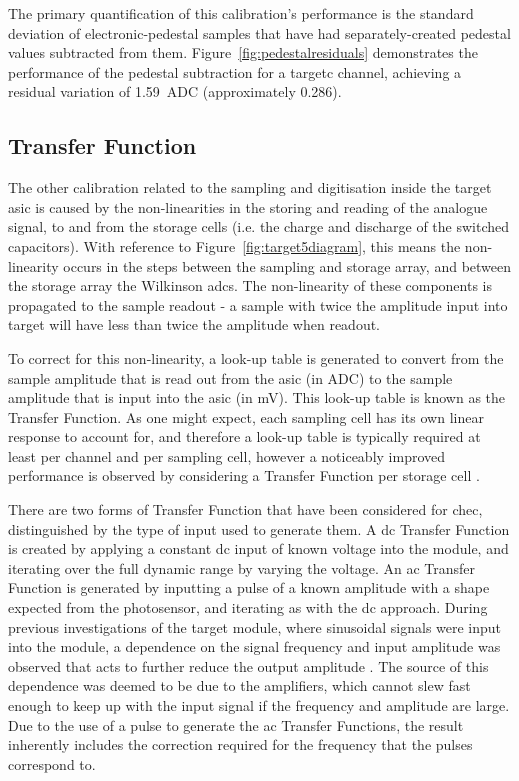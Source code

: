 The primary quantification of this calibration's performance is the standard deviation of electronic-pedestal samples that have had separately-created pedestal values subtracted from them. Figure~\ref{fig:pedestalresiduals} demonstrates the performance of the pedestal subtraction for a \gls{targetc} channel, achieving a residual variation of \SI{1.59}{ADC} (approximately \SI{0.286}{\pe}).

\subsection{Transfer Function}

The other calibration related to the sampling and digitisation inside the \gls{target} \gls{asic} is caused by the non-linearities in the storing and reading of the analogue signal, to and from the storage cells (i.e. the charge and discharge of the switched capacitors). With reference to Figure~\ref{fig:target5diagram}, this means the non-linearity occurs in the steps between the sampling and storage array, and between the storage array the Wilkinson \glspl{adc}. The non-linearity of these components is propagated to the sample readout - a sample with twice the amplitude input into \gls{target} will have less than twice the amplitude when readout.

To correct for this non-linearity, a look-up table is generated to convert from the sample amplitude that is read out from the \gls{asic} (in \si{ADC}) to the sample amplitude that is input into the \gls{asic} (in \si{mV}). This look-up table is known as the Transfer Function. As one might expect, each sampling cell has its own linear response to account for, and therefore a look-up table is typically required at least per channel and per sampling cell, however a noticeably improved performance is observed by considering a Transfer Function per storage cell .

There are two forms of Transfer Function that have been considered for \gls{chec}, distinguished by the type of input used to generate them. A \gls{dc} Transfer Function is created by applying a constant \gls{dc} input of known voltage into the module, and iterating over the full dynamic range by varying the voltage. An \gls{ac} Transfer Function is generated by inputting a pulse of a known amplitude with a shape expected from the photosensor, and iterating as with the \gls{dc} approach. During previous investigations of the \gls{target} module, where sinusoidal signals were input into the module, a dependence on the signal frequency and input amplitude was observed that acts to further reduce the output amplitude \cite{Bechtol2012,Albert2017}. The source of this dependence was deemed to be due to the amplifiers, which cannot slew fast enough to keep up with the input signal if the frequency and amplitude are large. Due to the use of a pulse to generate the \gls{ac} Transfer Functions, the result inherently includes the correction required for the frequency that the pulses correspond to. 

